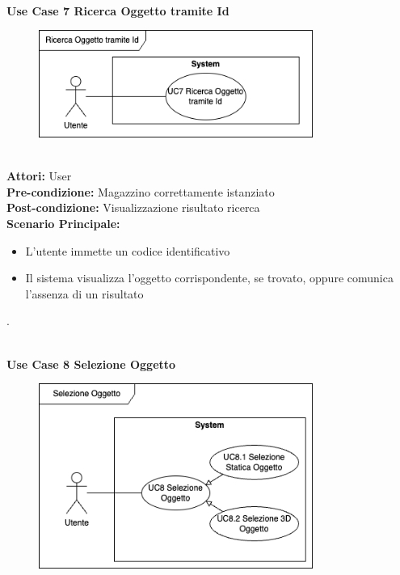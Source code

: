 \vspace{0.5cm}



\Large\textbf{}\\
\Large\textbf{Use Case 7 Ricerca Oggetto tramite Id} \\
\vspace{0.5cm}
\begin{figure}[h]
  \centering
  \includegraphics[width=0.8\textwidth]{UseCasesImages/ObjResearchId.drawio.png}
\end{figure}

\large\textbf{} \\
\textbf{Attori:} User\\
\textbf{Pre-condizione:}  Magazzino correttamente istanziato\\
\textbf{Post-condizione: } Visualizzazione risultato ricerca\\
\textbf{Scenario Principale:} \\
\begin{itemize}
  \item L'utente immette un codice identificativo
  \item Il sistema visualizza l'oggetto corrispondente, se trovato, oppure comunica l'assenza di un risultato
\end{itemize}.

\vspace{0.5cm}

\Large\textbf{}\\
\Large\textbf{Use Case 8 Selezione Oggetto} \\
\begin{figure}[h]
  \centering
 \includegraphics[width=0.8\textwidth]{UseCasesImages/ObjSelection.drawio.png}
\end{figure}

